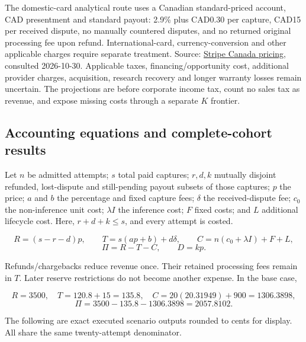 \documentclass[
  11pt,
]{article}
\begin{document}
The domestic-card analytical route uses a Canadian standard-priced
account, CAD presentment and standard payout: 2.9\% plus CAD0.30 per
capture, CAD15 per received dispute, no manually countered disputes, and
no returned original processing fee upon refund. International-card,
currency-conversion and other applicable charges require separate
treatment. Source: \href{https://stripe.com/en-ca/pricing}{Stripe Canada
pricing}, consulted 2026-10-30. Applicable taxes, financing/opportunity
cost, additional provider charges, acquisition, research recovery and
longer warranty losses remain uncertain. The projections are before
corporate income tax, count no sales tax as revenue, and expose missing
costs through a separate \(K\) frontier.

\hypertarget{accounting-equations-and-complete-cohort-results}{%
\subsection{Accounting equations and complete-cohort
results}\label{accounting-equations-and-complete-cohort-results}}

Let \(n\) be admitted attempts; \(s\) total paid captures; \(r,d,k\)
mutually disjoint refunded, lost-dispute and still-pending payout
subsets of those captures; \(p\) the price; \(a\) and \(b\) the
percentage and fixed capture fees; \(\delta\) the received-dispute fee;
\(c_0\) the non-inference unit cost; \(\lambda I\) the inference cost;
\(F\) fixed costs; and \(L\) additional lifecycle cost. Here,
\(r+d+k\le s\), and every attempt is costed.

\[
R=(s-r-d)p,\qquad
T=s(ap+b)+d\delta,\qquad
C=n(c_0+\lambda I)+F+L,
\] \[
\Pi=R-T-C,\qquad D=kp.
\]

Refunds/chargebacks reduce revenue once. Their retained processing fees
remain in \(T\). Later reserve restrictions do not become another
expense. In the base case,

\[
R=3500,\quad T=120.8+15=135.8,\quad
C=20(20.31949)+900=1306.3898,
\] \[
\Pi=3500-135.8-1306.3898=2057.8102.
\]

The following are exact executed scenario outputs rounded to cents for
display. All share the same twenty-attempt denominator.
\end{document}
